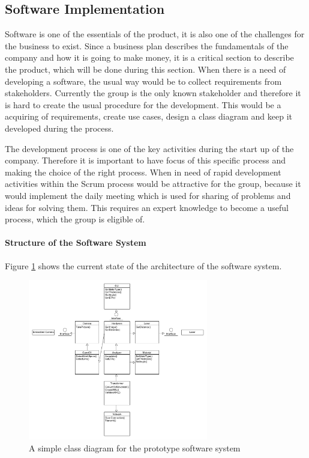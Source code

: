 \subsection{Software Implementation}
Software is one of the essentials of the product, it is also one of the challenges for the business to exist. Since a business plan describes the fundamentals of the company and how it is going to make money, it is a critical section to describe the product, which will be done during this section. When there is a need of developing a software, the usual way would be to collect requirements from stakeholders. Currently the group is the only known stakeholder and therefore it is hard to create the usual procedure for the development. This would be a acquiring of requirements, create use cases, design a class diagram and keep it developed during the process. 

The development process is one of the key activities during the start up of the company. Therefore it is important to have focus of this specific process and making the choice of the right process. When in need of rapid development activities within the Scrum process would be attractive for the group, because it would implement the daily meeting which is used for sharing of problems and ideas for solving them. This requires an expert knowledge to become a useful process, which the group is eligible of.

\paragraph*{Structure of the Software System}
Figure \ref{ClassDiagram} shows the current state of the architecture of the software system. 

\begin{figure}[h!]
\centering
\includegraphics[width=0.7\textwidth]{graphics/ClassDiagram}
\caption{A simple class diagram for the prototype software system}
\label{ClassDiagram}
\end{figure}

